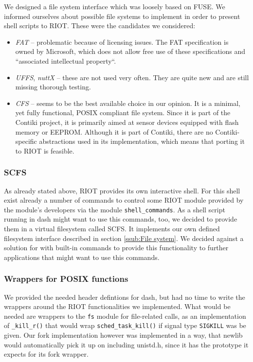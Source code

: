 \documentclass[conference]{IEEEtran}
\begin{document}
We designed a file system interface which was loosely based on
FUSE\cite{fuse}. We informed ourselves about possible file systems to
implement in order to present shell scripts to RIOT. These were the
candidates we considered:

\begin{itemize}
  \item \emph{FAT}\cite{fat} -- problematic because of licensing issues. The FAT
    specification is owned by Microsoft, which does not allow free use
    of these specifications and ``associated intellectual
    property``\cite{fatlicense}.
  \item \emph{UFFS}\cite{uffs}, \emph{nuttX}\cite{nuttx} -- these are
    not used very often. They are quite new and are still missing
    thorough testing.
  \item \emph{CFS}\cite{cfs} -- seems to be the best available choice in
    our opinion. It is a minimal, yet fully functional, POSIX compliant
    file system. Since it is part of the Contiki project\cite{contiki},
    it is primarily aimed at sensor devices equipped with flash memory
    or EEPROM. Although it is part of Contiki, there are no
    Contiki-specific abstractions used in its implementation, which
    means that porting it to RIOT is feasible.
\end{itemize}

\subsubsection{SCFS}
\label{ssub:SCFS}
As already stated above, RIOT provides its own interactive shell. For this
shell exist already a number of commands to control some RIOT module provided 
by the module's developers via the module \texttt{shell\_commands}. As a shell
script running in dash might want to use this commands, too, we decided to 
provide them in a virtual filesystem called SCFS. It implements our own defined
filesystem interface described in section \ref{ssub:File system}. We decided
against a solution for with built-in commands to provide this functionality
to further applications that might want to use this commands.

\subsubsection{Wrappers for POSIX functions}
\label{ssub:Wrappers for POSIX functions}
We provided the needed header defintions for dash, but had no time to write
the wrappers around the RIOT functionalities we implemented. What would be
needed are wrappers to the \texttt{fs} module for file-related calls, as an 
implementation of \texttt{\_kill\_r()} that would wrap
\texttt{sched\_task\_kill()} if signal type \texttt{SIGKILL} was be given.
Our fork implementation however was implemented in a way, that newlib would
automatically pick it up on including unistd.h, since it has the
prototype it expects for its fork wrapper.
\end{document}
